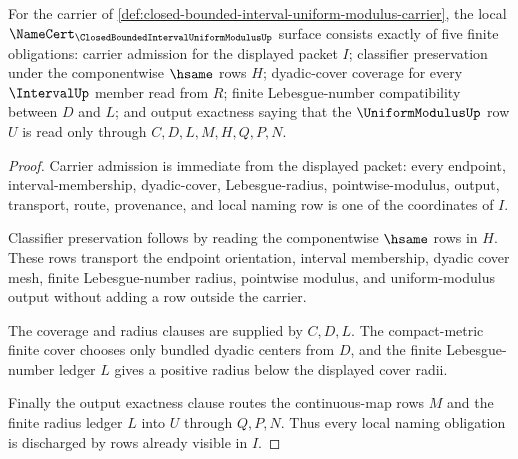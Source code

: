 \begin{theorem}
\label{thm:closed-bounded-interval-uniform-modulus-namecert-obligations}
For the carrier of \autoref{def:closed-bounded-interval-uniform-modulus-carrier}, the local $\NameCert_{\ClosedBoundedIntervalUniformModulusUp}$ surface consists exactly of five finite obligations: carrier admission for the displayed packet $I$; classifier preservation under the componentwise $\hsame$ rows $H$; dyadic-cover coverage for every $\IntervalUp$ member read from $R$; finite Lebesgue-number compatibility between $D$ and $L$; and output exactness saying that the $\UniformModulusUp$ row $U$ is read only through $C,D,L,M,H,Q,P,N$.
\end{theorem}
\begin{proof}
Carrier admission is immediate from the displayed packet: every endpoint, interval-membership, dyadic-cover, Lebesgue-radius, pointwise-modulus, output, transport, route, provenance, and local naming row is one of the coordinates of $I$.

Classifier preservation follows by reading the componentwise $\hsame$ rows in $H$. These rows transport the endpoint orientation, interval membership, dyadic cover mesh, finite Lebesgue-number radius, pointwise modulus, and uniform-modulus output without adding a row outside the carrier.

The coverage and radius clauses are supplied by $C,D,L$. The compact-metric finite cover chooses only bundled dyadic centers from $D$, and the finite Lebesgue-number ledger $L$ gives a positive radius below the displayed cover radii.

Finally the output exactness clause routes the continuous-map rows $M$ and the finite radius ledger $L$ into $U$ through $Q,P,N$. Thus every local naming obligation is discharged by rows already visible in $I$.
\end{proof}

